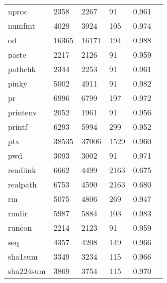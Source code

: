\begin{longtable}{lp{2.20cm}p{2.20cm}p{2.20cm}p{2.20cm}p{2.20cm}}
nproc     &                     2358 &         2267 &            91 &                    0.961 \\
numfmt    &                     4029 &         3924 &           105 &                    0.974 \\
od        &                    16365 &        16171 &           194 &                    0.988 \\
paste     &                     2217 &         2126 &            91 &                    0.959 \\
pathchk   &                     2344 &         2253 &            91 &                    0.961 \\
pinky     &                     5002 &         4911 &            91 &                    0.982 \\
pr        &                     6996 &         6799 &           197 &                    0.972 \\
printenv  &                     2052 &         1961 &            91 &                    0.956 \\
printf    &                     6293 &         5994 &           299 &                    0.952 \\
ptx       &                    38535 &        37006 &          1529 &                    0.960 \\
pwd       &                     3093 &         3002 &            91 &                    0.971 \\
readlink  &                     6662 &         4499 &          2163 &                    0.675 \\
realpath  &                     6753 &         4590 &          2163 &                    0.680 \\
rm        &                     5075 &         4806 &           269 &                    0.947 \\
rmdir     &                     5987 &         5884 &           103 &                    0.983 \\
runcon    &                     2214 &         2123 &            91 &                    0.959 \\
seq       &                     4357 &         4208 &           149 &                    0.966 \\
sha1sum   &                     3349 &         3234 &           115 &                    0.966 \\
sha224sum &                     3869 &         3754 &           115 &                    0.970 \\

\end{longtable}
